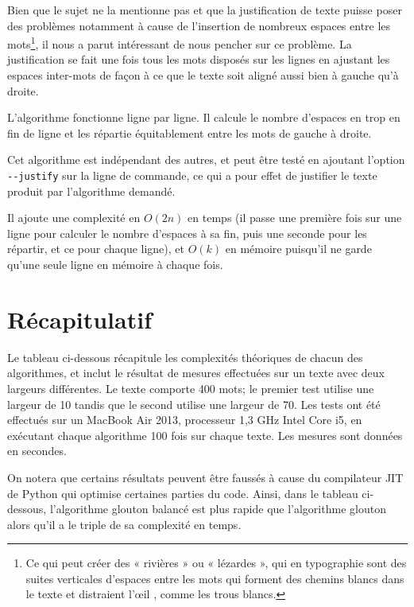 \documentclass[a4paper, 11pt]{article}
\begin{document}
Bien que le sujet ne la mentionne pas et que la justification de texte puisse
poser des problèmes \cite{Van96cognitive} notamment à cause de l'insertion de
nombreux espaces entre les mots\footnote{Ce qui peut créer des « rivières » ou
« lézardes », qui en typographie sont des suites verticales d'espaces entre les
mots qui forment des chemins blancs dans le texte et distraient l'œil
\cite{Harkins12fr}, comme les trous blancs.}, il nous a parut intéressant de
nous pencher sur ce problème. La justification se fait une fois tous les mots
disposés sur les lignes en ajustant les espaces inter-mots de façon à ce que le
texte soit aligné aussi bien à gauche qu'à droite.

L'algorithme fonctionne ligne par ligne. Il calcule le nombre d'espaces en trop
en fin de ligne et les répartie équitablement entre les mots de gauche à droite.

Cet algorithme est indépendant des autres, et peut être testé en ajoutant
l'option \verb|--justify| sur la ligne de commande, ce qui a pour effet de
justifier le texte produit par l'algorithme demandé.

Il ajoute une complexité en $O(2n)$ en temps (il passe une première fois sur une
ligne pour calculer le nombre d'espaces à sa fin, puis une seconde pour les
répartir, et ce pour chaque ligne), et $O(k)$ en mémoire puisqu'il ne garde
qu'une seule ligne en mémoire à chaque fois.

\part{Récapitulatif}

Le tableau ci-dessous récapitule les complexités théoriques de chacun des
algorithmes, et inclut le résultat de mesures effectuées sur un texte avec deux
largeurs différentes. Le texte comporte 400 mots; le premier test utilise une
largeur de 10 tandis que le second utilise une largeur de 70. Les tests ont été
effectués sur un MacBook Air 2013, processeur 1,3 GHz Intel Core i5, en
exécutant chaque algorithme 100 fois sur chaque texte. Les mesures sont données
en secondes.

On notera que certains résultats peuvent être faussés à cause du compilateur JIT
de Python qui optimise certaines parties du code. Ainsi, dans le tableau
ci-dessous, l'algorithme glouton balancé est plus rapide que l'algorithme
glouton alors qu'il a le triple de sa complexité en temps.
\end{document}
